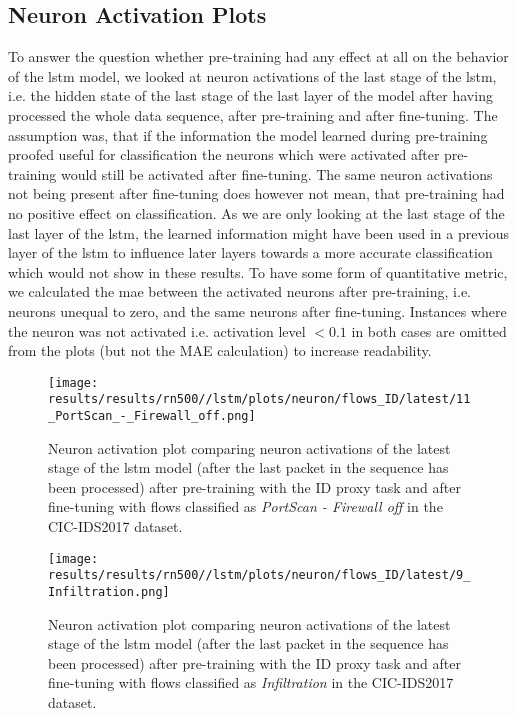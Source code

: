 \subsection{Neuron Activation Plots}

To answer the question whether pre-training had any effect at all on the behavior of the \gls{lstm} model, we looked at neuron activations of the last stage of the \gls{lstm}, i.e. the hidden state of the last stage of the last layer of the model after having processed the whole data sequence, after pre-training and after fine-tuning. The assumption was, that if the information the model learned during pre-training proofed useful for classification the neurons which were activated after pre-training would still be activated after fine-tuning. The same neuron activations not being present after fine-tuning does however not mean, that pre-training had no positive effect on classification. As we are only looking at the last stage of the last layer of the \gls{lstm}, the learned information might have been used in a previous layer of the \gls{lstm} to influence later layers towards a more accurate classification which would not show in these results. To have some form of quantitative metric, we calculated the \gls{mae} between the activated neurons after pre-training, i.e. neurons unequal to zero, and the same neurons after fine-tuning. Instances where the neuron was not activated i.e. activation level $< 0.1$ in both cases are omitted from the plots (but not the MAE calculation) to increase readability.

\begin{figure}[h]
	\centering
	\texttt{[image: results/results/rn500//lstm/plots/neuron/flows\_ID/latest/11\_PortScan\_-\_Firewall\_off.png]}
	\caption{Neuron activation plot comparing neuron activations of the latest stage of the \gls{lstm} model (after the last packet in the sequence has been processed) after pre-training with the ID proxy task and after fine-tuning with flows classified as \textit{PortScan - Firewall off} in the CIC-IDS2017 dataset.}
	\label{fig:results:lstm:neuron:cic17_id_port_scan_firewall_off}
\end{figure}

\begin{figure}[h]
	\centering
	\texttt{[image: results/results/rn500//lstm/plots/neuron/flows\_ID/latest/9\_Infiltration.png]}
	\caption{Neuron activation plot comparing neuron activations of the latest stage of the \gls{lstm} model (after the last packet in the sequence has been processed) after pre-training with the ID proxy task and after fine-tuning with flows classified as \textit{Infiltration} in the CIC-IDS2017 dataset.}
	\label{fig:results:lstm:neuron:cic17_id_infiltration}
\end{figure}

